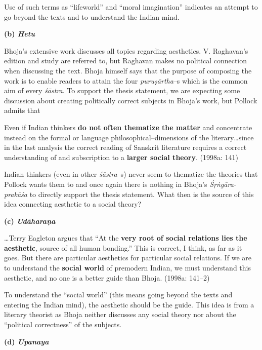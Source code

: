 Use of such terms as “lifeworld” and “moral imagination” indicates an attempt to go beyond the texts and to understand the Indian mind.

\textbf{(b) \textit{Hetu}}

Bhoja’s extensive work discusses all topics regarding aesthetics. V. Raghavan’s edition and study are referred to, but Raghavan makes no political connection when discussing the text. Bhoja himself says that the purpose of composing the work is to enable readers to attain the four \textit{puruṣārtha}–s which is the common aim of every \textit{śāstra}. To support the thesis statement, we are expecting some discussion about creating politically correct subjects in Bhoja’s work, but Pollock admits that

\begin{myquote}
Even if Indian thinkers \textbf{do not often thematize the matter} and concentrate instead on the formal or language philosophical–dimensions of the literary…since in the last analysis the correct reading of Sanskrit literature requires a correct understanding of and subscription to a \textbf{larger social theory}. (1998a: 141)
\end{myquote}

Indian thinkers (even in other \textit{śāstra}–s) never seem to thematize the theories that Pollock wants them to and once again there is nothing in Bhoja’s \textit{Śṛṅgāra-prakāśa} to directly support the thesis statement. What then is the source of this idea connecting aesthetic to a social theory?

\textbf{(c) \textit{Udāharaṇa}}

\begin{myquote}
…Terry Eagleton argues that “At the \textbf{very root of social relations lies the aesthetic}, source of all human bonding.” This is correct, I think, as far as it goes. But there are particular aesthetics for particular social relations. If we are to understand the \textbf{social world} of premodern Indian, we must understand this aesthetic, and no one is a better guide than Bhoja. (1998a: 141–2)
\end{myquote}

To understand the “social world” (this means going beyond the texts and entering the Indian mind), the aesthetic should be the guide. This idea is from a literary theorist as Bhoja neither discusses any social theory nor about the “political correctness” of the subjects.

\textbf{(d) \textit{Upanaya}}

